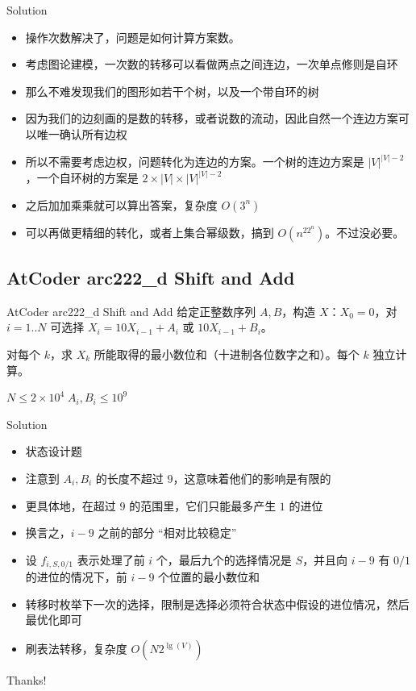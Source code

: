 ﻿\documentclass[aspectratio=169]{ctexbeamer}
\begin{document}
\begin{frame}{Solution}
    \begin{itemize}
        \item 操作次数解决了，问题是如何计算方案数。
        \item 考虑图论建模，一次数的转移可以看做两点之间连边，一次单点修则是自环
        \item 那么不难发现我们的图形如若干个树，以及一个带自环的树
        \item 因为我们的边刻画的是数的转移，或者说数的流动，因此自然一个连边方案可以唯一确认所有边权
        \item 所以不需要考虑边权，问题转化为连边的方案。一个树的连边方案是 $|V|^{|V|-2}$，一个自环树的方案是 $2\times|V|\times|V|^{|V|-2}$
        \item 之后加加乘乘就可以算出答案，复杂度 $O(3^n)$
        \item 可以再做更精细的转化，或者上集合幂级数，搞到 $O(n^22^n)$。不过没必要。
    \end{itemize}
\end{frame}


\subsection{AtCoder arc222\_d Shift and Add}
\begin{frame}{AtCoder arc222\_d Shift and Add}
    给定正整数序列 $A,B$，构造 $X$：$X_0=0$，对 $i=1..N$ 可选择 $X_i=10X_{i-1}+A_i$ 或 $10X_{i-1}+B_i$。
    
    对每个 $k$，求 $X_k$ 所能取得的最小数位和（十进制各位数字之和）。每个 $k$ 独立计算。
    
    $N\le 2\times10^4\; A_i,B_i\le 10^9$
\end{frame}

\begin{frame}{Solution}
    \begin{itemize}
        \item 状态设计题
        \item 注意到 $A_i,B_i$ 的长度不超过 $ 9 $，这意味着他们的影响是有限的
        \item 更具体地，在超过 $ 9 $ 的范围里，它们只能最多产生 $ 1 $ 的进位
        \item 换言之，$i-9$ 之前的部分 “相对比较稳定”
        \item 设 $f_{i,S,0/1}$ 表示处理了前 $ i $ 个，最后九个的选择情况是 $S$，并且向 $i-9$ 有 $0/1$ 的进位的情况下，前 $i-9$ 个位置的最小数位和
        \item 转移时枚举下一次的选择，限制是选择必须符合状态中假设的进位情况，然后最优化即可
        \item 刷表法转移，复杂度 $O(N2^{\lg(V)})$
    \end{itemize}
\end{frame}



\begin{frame}
    \begin{center}
        {\Huge\calligra Thanks!}
    \end{center}
\end{frame}
\end{document}

